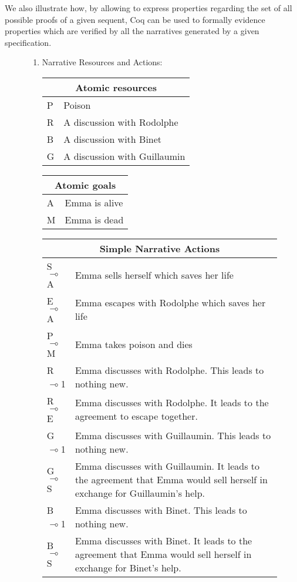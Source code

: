\documentclass[runningheads,a4paper]{llncs}
\begin{document}
We also illustrate how, by allowing to express properties regarding the set of all possible proofs of a given sequent, Coq can be used to formally evidence properties which are verified by all the narratives generated by a given specification.
\begin{figure}
\begin{enumerate}
\item Narrative Resources and Actions:

\vspace{0.1in}
\begin{tabular} {|l|l|}
\hline
\multicolumn{2}{|c|}{Atomic resources}\\ \hline
P      & Poison\\
R      & A discussion with Rodolphe\\
B      & A discussion with Binet\\
G      & A discussion with Guillaumin\\
\hline
\end{tabular}
\begin{tabular}{|l|l|}
\hline
\multicolumn{2}{|c|}{Atomic goals}\\ \hline
A     & Emma is alive\\
M     & Emma is dead\\
\hline
\end{tabular}

\vspace{0.1in}
\begin{tabular}{|p{}|p{}|}
\hline
\multicolumn{2}{|c|}{Simple Narrative Actions}\\ \hline
S$\multimap$A & Emma sells herself which saves her life\\
E$\multimap$A & Emma escapes with Rodolphe which saves her life\\
P$\multimap$M & Emma takes poison and dies\\ 
R$\multimap$1 & Emma discusses with Rodolphe. This leads to nothing new.\\
R$\multimap$E & Emma discusses with Rodolphe. It leads to the agreement to escape together.\\
G$\multimap$1 & Emma discusses with Guillaumin. This leads to nothing new.\\
G$\multimap$S & Emma discusses with Guillaumin. It leads to the agreement that Emma would sell herself in exchange for Guillaumin's help.\\
B$\multimap$1 & Emma discusses with Binet. This leads to nothing new.\\
B$\multimap$S & Emma discusses with Binet. It leads to the agreement that Emma would sell herself in exchange for Binet's help.\\
\hline
\end{tabular}


\end{enumerate}
\end{figure}
\end{document}
